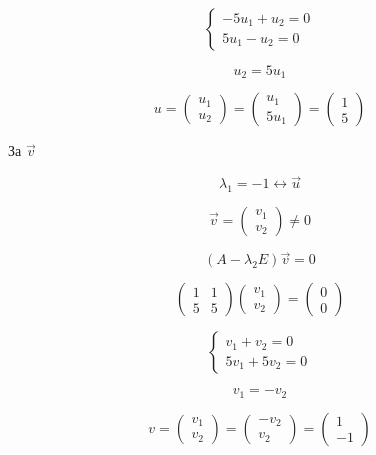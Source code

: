 \documentclass{scrartcl}
\begin{document}
$$
\begin{cases}
    -5u_1+u_2=0\\
    5u_1-u_2=0
\end{cases}
$$

$$u_2=5u_1$$

$$
u =
\begin{pmatrix}
    u_1\\u_2
\end{pmatrix}
=
\begin{pmatrix}
    u_1\\5u_1
\end{pmatrix}
=
\begin{pmatrix}
    1\\5
\end{pmatrix}
$$

За $\overrightarrow{v}$

$$\lambda_1 = -1 \longleftrightarrow \overrightarrow{u}$$

$$
\overrightarrow{v} =
\begin{pmatrix}
    v_1\\v_2
\end{pmatrix}
\ne 0
$$

$$(A-\lambda_2 E)\overrightarrow{v} = 0$$

$$
\begin{pmatrix}
    1 & 1\\
    5 & 5
\end{pmatrix}
\begin{pmatrix}
    v_1\\
    v_2
\end{pmatrix}
=
\begin{pmatrix}
    0\\
    0
\end{pmatrix}
$$

$$
\begin{cases}
    v_1+v_2=0\\
    5v_1+5v_2=0
\end{cases}
$$

$$v_1=-v_2$$

$$
v =
\begin{pmatrix}
    v_1\\v_2
\end{pmatrix}
=
\begin{pmatrix}
    -v_2\\v_2
\end{pmatrix}
=
\begin{pmatrix}
    1\\-1
\end{pmatrix}
$$
\end{document}
